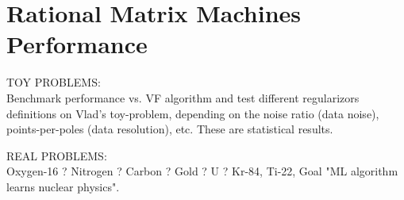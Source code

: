 \documentclass{article}
\begin{document}
\section{\label{sec: Rational Matrix Machines Performance}Rational Matrix Machines Performance}

TOY PROBLEMS:\\
Benchmark performance vs. VF algorithm and test different regularizors definitions on Vlad's toy-problem, depending on the noise ratio (data noise), points-per-poles (data resolution), etc.
These are statistical results. 

REAL PROBLEMS:\\
Oxygen-16 ? Nitrogen ? Carbon ? Gold ? U ? Kr-84, Ti-22, 
Goal "ML algorithm learns nuclear physics". 



















\end{document}
